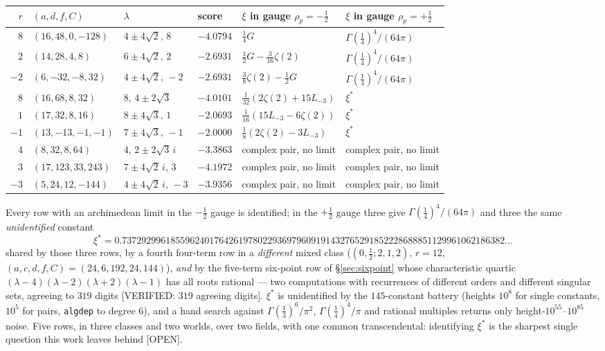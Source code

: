 \documentclass[11pt,reqno]{amsart}
\theoremstyle{plain}
\theoremstyle{definition}
\theoremstyle{remark}
\theoremstyle{plain}
\newcommand{\Verified}[1]{\textup{\textsf{[VERIFIED: #1]}}}
\newcommand{\Open}{\textup{\textsf{[OPEN]}}}
\begin{document}
\begin{center}\footnotesize
\begin{tabular}{rlllll}
\toprule
$r$ & $(a,d,f,C)$ & $\lambda$ & score & $\xi$ in gauge $\rho_p=-\tfrac12$ & $\xi$ in gauge $\rho_p=+\tfrac12$\\
\midrule
$8$ & $(16,48,0,-128)$ & $4{\pm}4\sqrt2,\,8$ & $-4.0794$ & $\tfrac14G$ & $\Gamma(\tfrac14)^4/(64\pi)$\\
$2$ & $(14,28,4,8)$ & $6{\pm}4\sqrt2,\,2$ & $-2.6931$ & $\tfrac12G-\tfrac3{16}\zeta(2)$ & $\Gamma(\tfrac14)^4/(64\pi)$\\
$-2$ & $(6,-32,-8,32)$ & $4{\pm}4\sqrt2,\,-2$ & $-2.6931$ & $\tfrac38\zeta(2)-\tfrac12G$ & $\Gamma(\tfrac14)^4/(64\pi)$\\
$8$ & $(16,68,8,32)$ & $8,\,4{\pm}2\sqrt3$ & $-4.0101$ & $\tfrac1{32}(2\zeta(2){+}15L_{-3})$ & $\xi^*$\\
$1$ & $(17,32,8,16)$ & $8{\pm}4\sqrt3,\,1$ & $-2.0693$ & $\tfrac1{16}(15L_{-3}{-}6\zeta(2))$ & $\xi^*$\\
$-1$ & $(13,-13,-1,-1)$ & $7{\pm}4\sqrt3,\,-1$ & $-2.0000$ & $\tfrac18(2\zeta(2){-}3L_{-3})$ & $\xi^*$\\
$4$ & $(8,32,8,64)$ & $4,\,2{\pm}2\sqrt3\,i$ & $-3.3863$ & complex pair, no limit & complex pair, no limit\\
$3$ & $(17,123,33,243)$ & $7{\pm}4\sqrt2\,i,\,3$ & $-4.1972$ & complex pair, no limit & complex pair, no limit\\
$-3$ & $(5,24,12,-144)$ & $4{\pm}4\sqrt2\,i,\,-3$ & $-3.9356$ & complex pair, no limit & complex pair, no limit\\
\bottomrule
\end{tabular}
\end{center}

Every row with an archimedean limit in the $-\tfrac12$ gauge is identified; in
the $+\tfrac12$ gauge three give $\Gamma(\tfrac14)^4/(64\pi)$ and three the same
\emph{unidentified} constant
\[
\xi^*=0.7372929961855962401764261978022936979609191432765291852228688851129961062186382\dots
\]
shared by those three rows, by a fourth four-term row in a \emph{different}
mixed class ($(0,\tfrac12;2,1,2)$, $r=12$, $(a,c,d,f,C)=(24,6,192,24,144)$),
\emph{and} by the five-term six-point row of \S\ref{sec:sixpoint} whose
characteristic quartic $(\lambda-4)(\lambda-2)(\lambda+2)(\lambda-1)$ has all
roots rational --- two computations with recurrences of different orders and
different singular sets, agreeing to $319$ digits \Verified{$319$ agreeing
digits}. $\xi^*$ is unidentified by the $145$-constant battery (heights $10^8$
for single constants, $10^5$ for pairs, \texttt{algdep} to degree $6$), and a
hand search against $\Gamma(\tfrac13)^6/\pi^2$, $\Gamma(\tfrac14)^4/\pi$ and
rational multiples returns only height-$10^{55}$--$10^{85}$ noise. Five rows, in
three classes and two worlds, over two fields, with one common transcendental:
identifying $\xi^*$ is the sharpest single question this work leaves behind
\Open.
\end{document}
